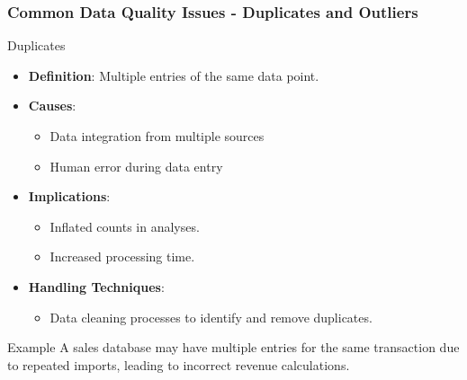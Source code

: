 \documentclass{beamer}
\begin{document}
\begin{frame}[fragile]
    \frametitle{Common Data Quality Issues - Duplicates and Outliers}
    \begin{block}{Duplicates}
        \begin{itemize}
            \item \textbf{Definition}: Multiple entries of the same data point.
            \item \textbf{Causes}:
                \begin{itemize}
                    \item Data integration from multiple sources
                    \item Human error during data entry
                \end{itemize}
            \item \textbf{Implications}:
                \begin{itemize}
                    \item Inflated counts in analyses.
                    \item Increased processing time.
                \end{itemize}
            \item \textbf{Handling Techniques}:
                \begin{itemize}
                    \item Data cleaning processes to identify and remove duplicates.
                \end{itemize}
        \end{itemize}
    \end{block}
    \begin{exampleblock}{Example}
        A sales database may have multiple entries for the same transaction due to repeated imports, leading to incorrect revenue calculations.
    \end{exampleblock}
    

\end{frame}
\end{document}

